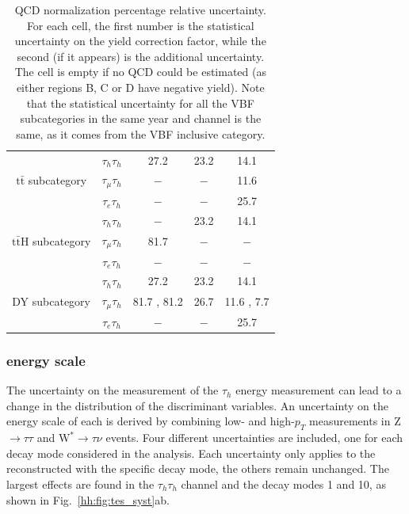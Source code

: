 \documentclass[../main.tex]{subfiles}
\begin{document}
\begin{table}[!h]
\begin{center}
\begin{tabular}{c | c | c | c | c}
                                        & $\tau_h\tau_h$   & 27.2         & 23.2         & 14.1         \\
    $\text{t}\bar{\text{t}}$ subcategory& $\tau_\mu\tau_h$ & $-$          & $-$          & 11.6         \\
                                        & $\tau_e\tau_h$   & $-$          & $-$          & 25.7         \\
    \hline
                                        & $\tau_h\tau_h$   & $-$          & 23.2         & 14.1         \\
    $\text{t}\bar{\text{t}}$H subcategory                    & $\tau_\mu\tau_h$ & 81.7         & $-$          & $-$          \\
                                        & $\tau_e\tau_h$   & $-$          & $-$          & $-$          \\
    \hline
                                        & $\tau_h\tau_h$   & 27.2         & 23.2         & 14.1         \\
    DY subcategory                     & $\tau_\mu\tau_h$ & 81.7 , 81.2  & 26.7         & 11.6 , 7.7   \\
                                        & $\tau_e\tau_h$   & $-$          & $-$          & 25.7         \\
     \hline
    \end{tabular}
  \end{center}
    \caption[QCD normalization percentage relative uncertainty]{QCD normalization percentage relative uncertainty. For each cell, the first number is the statistical uncertainty on the yield correction factor, while the second (if it appears) is the additional uncertainty.
    The cell is empty if no QCD could be estimated (as either regions B, C or D have negative yield). Note that the statistical uncertainty for all the VBF subcategories in the same year and channel is the same, as it comes from the VBF inclusive category.}
	\label{hh:tab:qcd_unc}
\end{table}

\subsubsection*{\tauh{} energy scale}

The uncertainty on the measurement of the $\tau_h$ energy measurement can lead to a change in the distribution of the discriminant variables. An uncertainty on the energy scale of each \tauh{} is derived by combining low- and high-$p_T$ measurements in Z$\to\tau\tau$ and $\text{W}^*\to\tau\nu$ events. Four different uncertainties are included, one for each \tauh{} decay mode considered in the analysis. Each uncertainty only applies to the \tauh{} reconstructed with the specific decay mode, the others remain unchanged. The largest effects are found in the $\tau_h\tau_h$ channel and the decay modes 1 and 10, as shown in Fig.~\ref{hh:fig:tes_syst}ab.
\end{document}
